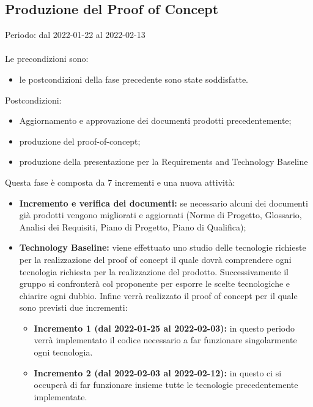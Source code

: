 \subsection{Produzione del Proof of Concept}
Periodo: dal 2022-01-22 al 2022-02-13  \mbox{} \\ \mbox{} \\
Le precondizioni sono:
\begin{itemize}
    \item le postcondizioni della fase precedente sono state soddisfatte.
\end{itemize}

Postcondizioni:
\begin{itemize}
    \item Aggiornamento e approvazione dei documenti prodotti precedentemente;
    \item produzione del proof-of-concept;
    \item produzione della presentazione per la Requirements and Technology Baseline
\end{itemize}

Questa fase è composta da 7 incrementi e una nuova attività:
\begin{itemize}
    \item \textbf{Incremento e verifica dei documenti:} se necessario alcuni dei documenti già
    prodotti vengono migliorati e aggiornati (Norme di Progetto, Glossario,
    Analisi dei Requisiti, Piano di Progetto, Piano di Qualifica);
    \item \textbf{Technology Baseline:} viene effettuato uno studio delle tecnologie richieste per la realizzazione del proof of concept il quale dovrà comprendere ogni tecnologia richiesta per la realizzazione del prodotto. Successivamente il gruppo si confronterà col proponente per esporre le scelte tecnologiche e chiarire ogni dubbio. Infine verrà realizzato il proof of concept per il quale sono previsti due incrementi:
    \begin{itemize}
        \item \textbf{Incremento 1 (dal 2022-01-25 al 2022-02-03):} in questo periodo verrà implementato il codice necessario a far funzionare singolarmente ogni tecnologia.
        \item \textbf{Incremento 2 (dal 2022-02-03 al 2022-02-12):} in questo ci si occuperà di far funzionare insieme tutte le tecnologie precedentemente implementate.
    \end{itemize}
\end{itemize}

